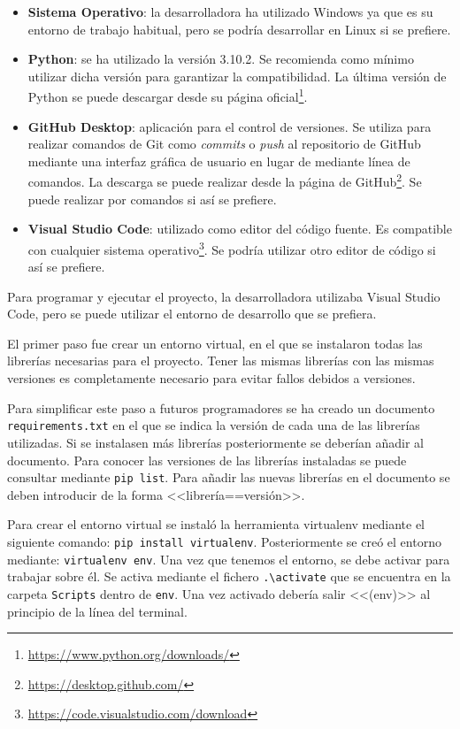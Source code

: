\begin{itemize}
    \item \textbf{Sistema Operativo}: la desarrolladora ha utilizado Windows ya que es su entorno de trabajo habitual, pero se podría desarrollar en Linux si se prefiere.
    
    \item \textbf{Python}: se ha utilizado la versión 3.10.2. Se recomienda como mínimo utilizar dicha versión para garantizar la compatibilidad. La última versión de Python se puede descargar desde su página oficial\footnote{\url{https://www.python.org/downloads/}}.
    
    \item \textbf{GitHub Desktop}: aplicación para el control de versiones. Se utiliza para realizar comandos de Git como \textit{commits} o \textit{push} al repositorio de GitHub mediante una interfaz gráfica de usuario en lugar de mediante línea de comandos. La descarga se puede realizar desde la página de GitHub\footnote{\url{https://desktop.github.com/}}. Se puede realizar por comandos si así se prefiere.
    
    \item \textbf{Visual Studio Code}: utilizado como editor del código fuente. Es compatible con cualquier sistema operativo\footnote{\url{https://code.visualstudio.com/download}}. Se podría utilizar otro editor de código si así se prefiere.
\end{itemize}

Para programar y ejecutar el proyecto, la desarrolladora utilizaba Visual Studio Code, pero se puede utilizar el entorno de desarrollo que se prefiera. 

El primer paso fue crear un entorno virtual, en el que se instalaron todas las librerías necesarias para el proyecto. Tener las mismas librerías con las mismas versiones es completamente necesario para evitar fallos debidos a versiones.

Para simplificar este paso a futuros programadores se ha creado un documento \texttt{requirements.txt} en el que se indica la versión de cada una de las librerías utilizadas. Si se instalasen más librerías posteriormente se deberían añadir al documento. Para conocer las versiones de las librerías instaladas se puede consultar mediante \texttt{pip list}. Para añadir las nuevas librerías en el documento se deben introducir de la forma <<librería==versión>>.

Para crear el entorno virtual se instaló la herramienta virtualenv mediante el siguiente comando: \texttt{pip install virtualenv}. Posteriormente se creó el entorno mediante: \texttt{virtualenv env}. Una vez que tenemos el entorno, se debe activar para trabajar sobre él. Se activa mediante el fichero \texttt{.\textbackslash activate} que se encuentra en la carpeta \texttt{Scripts} dentro de \texttt{env}. Una vez activado debería salir <<(env)>> al principio de la línea del terminal.

